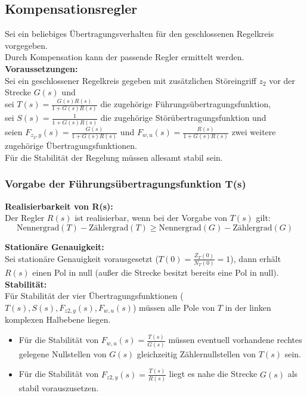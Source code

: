 \documentclass[10pt,a4paper]{article}
\begin{document}
\subsection{Kompensationsregler}
Sei ein beliebiges Übertragungsverhalten für den geschlossenen Regelkreis vorgegeben. \\
Durch Kompensation kann der passende Regler ermittelt werden. \\

\textbf{Voraussetzungen:} \\
Sei ein geschlossener Regelkreis gegeben mit zusätzlichen Störeingriff $z_2$ vor der Strecke $G(s)$ und \\
sei $T(s) = \frac{G(s)R(s)}{1 + G(s)R(s)}$ die zugehörige Führungsübertragungsfunktion, \\
sei $S(s) = \frac{1}{1 + G(s)R(s)}$ die zugehörige Störübertragungsfunktion und \\
seien $F_{z_2,y}(s) = \frac{G(s)}{1 + G(s)R(s)}$ und $F_{w,u}(s) = \frac{R(s)}{1 + G(s)R(s)}$ zwei weitere zugehörige Übertragungsfunktionen. \\
Für die Stabilität der Regelung müssen allesamt stabil sein.

\subsubsection{Vorgabe der Führungsübertragungsfunktion T(s)}
\textbf{Realisierbarkeit von R(s):} \\
Der Regler $R(s)$ ist realisierbar, wenn bei der Vorgabe von $T(s)$ gilt:
$$
	\text{Nennergrad}(T) - \text{Zählergrad}(T) ≥ \text{Nennergrad}(G) - \text{Zählergrad}(G)
$$

\textbf{Stationäre Genauigkeit:} \\
Sei stationäre Genauigkeit vorausgesetzt ($T(0) = \frac{Z_T(0)}{N_T(0)} = 1$), dann erhält $R(s)$ einen Pol in null (außer die Strecke besitzt bereits eine Pol in null). \\

\textbf{Stabilität:} \\
Für Stabilität der vier Übertragungsfunktionen ($T(s), S(s), F_{z2,y}(s), F_{w,u}(s)$) müssen alle Pole von $T$ in der linken komplexen Halbebene liegen.
\begin{itemize}
	\item Für die Stabilität von $F_{w,u}(s) = \frac{T(s)}{G(s)}$ müssen eventuell vorhandene rechtes gelegene Nullstellen von $G(s)$ gleichzeitig Zählernullstellen von $T(s)$ sein.
	\item Für die Stabilität von $F_{z2,y}(s) = \frac{T(s)}{R(s)}$ liegt es nahe die Strecke $G(s)$ als stabil vorauszusetzen.
\end{itemize}
\end{document}
